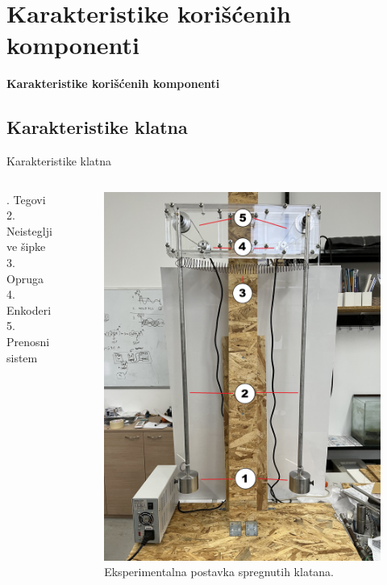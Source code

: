\documentclass[aspectratio=169,xcolor=dvipsnames]{beamer}
\begin{document}

\section{Karakteristike korišćenih komponenti}

\begin{frame}
    \Huge{\centerline{\textbf{Karakteristike korišćenih komponenti}}}
\end{frame}

\subsection{Karakteristike klatna}

\begin{frame}{Karakteristike klatna}
    
    
    \begin{columns}[c]
    \begin{column}{.4\textwidth}
    . Tegovi \\
    		 2. Neistegljive šipke \\
    		 3. Opruga \\
    		 4. Enkoderi \\
    		 5. Prenosni sistem
    \end{column}
    \begin{column}{.6\textwidth}
    \begin{figure}
    \includegraphics[width=0.5\linewidth]{master_fig/klatno2.jpeg}
    \caption{Eksperimentalna postavka spregnutih klatana.}
    \end{figure}
    \end{column}
\end{columns}
    
    
\end{frame}
\end{document}
